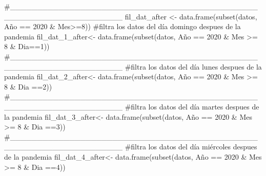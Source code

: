 \documentclass[
  us-letterpaper,
]{scrreprt}
\newenvironment{Shaded}{\begin{snugshade}}{\end{snugshade}}
\newcommand{\CommentTok}[1]{\textcolor[rgb]{0.37,0.37,0.37}{#1}}
\newcommand{\DecValTok}[1]{\textcolor[rgb]{0.68,0.00,0.00}{#1}}
\newcommand{\FunctionTok}[1]{\textcolor[rgb]{0.28,0.35,0.67}{#1}}
\newcommand{\NormalTok}[1]{\textcolor[rgb]{0.00,0.23,0.31}{#1}}
\newcommand{\OtherTok}[1]{\textcolor[rgb]{0.00,0.23,0.31}{#1}}
\newcommand{\SpecialCharTok}[1]{\textcolor[rgb]{0.37,0.37,0.37}{#1}}
\theoremstyle{definition}
\theoremstyle{plain}
\theoremstyle{plain}
\theoremstyle{remark}
\begin{document}
\begin{Shaded}
\begin{Highlighting}[]
\CommentTok{\#\_\_\_\_\_\_\_\_\_\_\_\_\_\_\_\_\_\_\_\_\_\_\_\_\_\_\_\_\_\_\_\_\_\_\_\_\_\_\_\_\_\_\_\_\_\_\_\_\_\_\_\_\_\_\_\_\_\_\_\_\_\_\_\_\_\_\_\_}
\NormalTok{fil\_dat\_after }\OtherTok{\textless{}{-}} \FunctionTok{data.frame}\NormalTok{(}\FunctionTok{subset}\NormalTok{(datos, Año }\SpecialCharTok{==} \DecValTok{2020} \SpecialCharTok{\&}\NormalTok{ Mes}\SpecialCharTok{\textgreater{}=}\DecValTok{8}\NormalTok{))}
\CommentTok{\#filtra los datos del día domingo despues de la pandemia}
\NormalTok{fil\_dat\_1\_after}\OtherTok{\textless{}{-}} \FunctionTok{data.frame}\NormalTok{(}\FunctionTok{subset}\NormalTok{(datos, }
\NormalTok{                                    Año }\SpecialCharTok{==} \DecValTok{2020} \SpecialCharTok{\&}\NormalTok{ Mes }\SpecialCharTok{\textgreater{}=} \DecValTok{8} \SpecialCharTok{\&}\NormalTok{ Dia}\SpecialCharTok{==}\DecValTok{1}\NormalTok{))}
\CommentTok{\#\_\_\_\_\_\_\_\_\_\_\_\_\_\_\_\_\_\_\_\_\_\_\_\_\_\_\_\_\_\_\_\_\_\_\_\_\_\_\_\_\_\_\_\_\_\_\_\_\_\_\_\_\_\_\_\_\_\_\_\_\_\_\_\_\_\_\_\_}
\CommentTok{\#filtra los datos del día lunes despues de la pandemia}
\NormalTok{fil\_dat\_2\_after}\OtherTok{\textless{}{-}} \FunctionTok{data.frame}\NormalTok{(}\FunctionTok{subset}\NormalTok{(datos,}
\NormalTok{                                    Año }\SpecialCharTok{==} \DecValTok{2020} \SpecialCharTok{\&}\NormalTok{ Mes }\SpecialCharTok{\textgreater{}=} \DecValTok{8} \SpecialCharTok{\&}\NormalTok{ Dia }\SpecialCharTok{==}\DecValTok{2}\NormalTok{))}
\CommentTok{\#\_\_\_\_\_\_\_\_\_\_\_\_\_\_\_\_\_\_\_\_\_\_\_\_\_\_\_\_\_\_\_\_\_\_\_\_\_\_\_\_\_\_\_\_\_\_\_\_\_\_\_\_\_\_\_\_\_\_\_\_\_\_\_\_\_\_\_\_}
\CommentTok{\#filtra los datos del día martes despues de la pandemia}
\NormalTok{fil\_dat\_3\_after}\OtherTok{\textless{}{-}} \FunctionTok{data.frame}\NormalTok{(}\FunctionTok{subset}\NormalTok{(datos,}
\NormalTok{                                    Año }\SpecialCharTok{==} \DecValTok{2020} \SpecialCharTok{\&}\NormalTok{ Mes }\SpecialCharTok{\textgreater{}=} \DecValTok{8} \SpecialCharTok{\&}\NormalTok{ Dia }\SpecialCharTok{==}\DecValTok{3}\NormalTok{))}
\CommentTok{\#\_\_\_\_\_\_\_\_\_\_\_\_\_\_\_\_\_\_\_\_\_\_\_\_\_\_\_\_\_\_\_\_\_\_\_\_\_\_\_\_\_\_\_\_\_\_\_\_\_\_\_\_\_\_\_\_\_\_\_\_\_\_\_\_\_\_\_\_}
\CommentTok{\#filtra los datos del día miércoles despues de la pandemia}
\NormalTok{fil\_dat\_4\_after}\OtherTok{\textless{}{-}} \FunctionTok{data.frame}\NormalTok{(}\FunctionTok{subset}\NormalTok{(datos,}
\NormalTok{                                    Año }\SpecialCharTok{==} \DecValTok{2020} \SpecialCharTok{\&}\NormalTok{ Mes }\SpecialCharTok{\textgreater{}=} \DecValTok{8} \SpecialCharTok{\&}\NormalTok{ Dia }\SpecialCharTok{==}\DecValTok{4}\NormalTok{))}

\end{Highlighting}
\end{Shaded}
\end{document}

